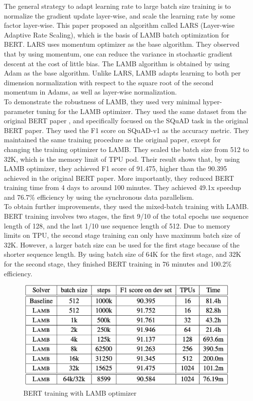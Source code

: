 \documentclass[conference]{IEEEtran}
\begin{document}
	The general strategy to adapt learning rate to large batch size training is to normalize the gradient update layer-wise, and scale the learning rate by some factor layer-wise. This paper\cite{LARS} proposed an algorithm called LARS (Layer-wise Adaptive Rate Scaling), which is the basis of LAMB batch optimization for BERT. LARS uses momentum optimizer as the base algorithm. They observed that by using momentum, one can reduce the variance in stochastic gradient descent at the cost of little bias. The LAMB algorithm\cite{LAMB} is obtained by using Adam as the base algorithm. Unlike LARS, LAMB adapts learning to both per dimension normalization with respect to the square root of the second momentum in Adams, as well as layer-wise normalization.\\
	
	To demonstrate the robustness of LAMB, they\cite{LAMB} used very minimal hyper-parameter tuning for the LAMB optimizer. They used the same dataset from the original BERT paper \cite{BERT}, and specifically focused on the SQuAD task in the original BERT paper. They used the F1 score on SQuAD-v1 as the accuracy metric. They maintained the same training procedure as the original paper, except for changing the training optimizer to LAMB. They scaled the batch size from 512 to 32K, which is the memory limit of TPU pod. Their result shows that, by using LAMB optimizer, they achieved F1 score of 91.475, higher than the 90.395 achieved in the original BERT paper. More importantly, they reduced BERT training time from 4 days to around 100 minutes. They achieved 49.1x speedup and 76.7\% efficiency by using the synchronous data parallelism.\\
	
	To obtain further improvements, they \cite{LAMB} used the mixed-batch training with LAMB. BERT training involves two stages, the first 9/10 of the total epochs use sequence length of 128, and the last 1/10 use sequence length of 512. Due to memory limits on TPU, the second stage training can only have maximum batch size of 32K. However, a larger batch size can be used for the first stage because of the shorter sequence length. By using batch size of 64K for the first stage, and 32K for the second stage, they finished BERT training in 76 minutes and 100.2\% efficiency.
	
	\begin{figure}[!htbp]
		\centering
		\includegraphics[scale=0.3]{figures/figure8.png}
		\caption{\label{fig:my-label} BERT training with LAMB optimizer \cite{LAMB}}
	\end{figure}
		
\end{document}
